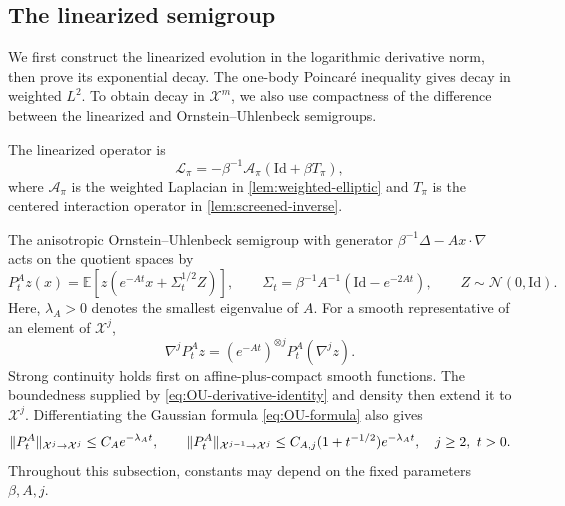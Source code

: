 \documentclass[11pt,reqno]{amsart}
\numberwithin{equation}{section}
\theoremstyle{plain}
\theoremstyle{remark}
\DeclarePairedDelimiter{\norm}{\lVert}{\rVert}
\newcommand{\E}{\mathbb E}\newcommand{\Q}{\mathbb Q}\newcommand{\Pb}{\mathbb P}
\newcommand{\Xspace}{\mathcal X}
\newcommand{\Aop}{\mathcal A}
\newcommand{\Id}{\mathrm{Id}}
\begin{document}
\subsection{The linearized semigroup}\label{app:linear-semigroup}
We first construct the linearized evolution in the logarithmic derivative norm, then prove its exponential decay. The one-body Poincar\'e inequality gives decay in weighted $L^2$. To obtain decay in $\Xspace^m$, we also use compactness of the difference between the linearized and Ornstein--Uhlenbeck semigroups.

The linearized operator is
\begin{equation}\label{eq:linearized-operator}
 \mathcal L_\pi=-\beta^{-1}\Aop_\pi(\Id+\beta T_\pi),
\end{equation}
where $\Aop_\pi$ is the weighted Laplacian in \cref{lem:weighted-elliptic} and $T_\pi$ is the centered interaction operator in \cref{lem:screened-inverse}.

The anisotropic Ornstein--Uhlenbeck semigroup with generator $\beta^{-1}\Delta-Ax\cdot\nabla$ acts on the quotient spaces by
\begin{equation}\label{eq:OU-formula}
 P_t^Az(x)=\E\left[z\left(e^{-At}x+\Sigma_t^{1/2}Z\right)\right],
 \qquad \Sigma_t=\beta^{-1}A^{-1}(\Id-e^{-2At}),\qquad Z\sim\mathcal N(0,\Id).
\end{equation}
Here, $\lambda_A>0$ denotes the smallest eigenvalue of $A$. For a smooth representative of an element of $\Xspace^j$,
\begin{equation}\label{eq:OU-derivative-identity}
 \nabla^jP_t^Az=(e^{-At})^{\otimes j}P_t^A(\nabla^jz).
\end{equation}
Strong continuity holds first on affine-plus-compact smooth functions. The boundedness supplied by \eqref{eq:OU-derivative-identity} and density then extend it to $\Xspace^j$. Differentiating the Gaussian formula \eqref{eq:OU-formula} also gives
\begin{equation}\label{eq:OU-estimates}
 \norm{P_t^A}_{\Xspace^j\to\Xspace^j}\le C_Ae^{-\lambda_A t},\qquad
 \norm{P_t^A}_{\Xspace^{j-1}\to\Xspace^j}\le C_{A,j}(1+t^{-1/2})e^{-\lambda_A t},
                    \quad j\ge2,\ t>0.
\end{equation}
Throughout this subsection, constants may depend on the fixed parameters $\beta,A,j$.
\end{document}
